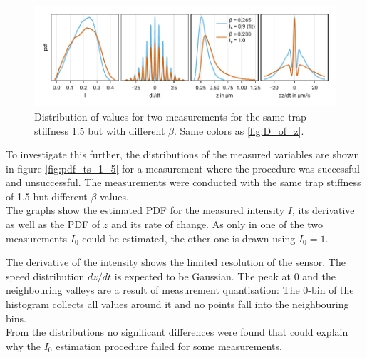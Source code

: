 \documentclass[
    twoside=false,
    twocolumn=true,
    fontsize=11pt,
]{scrarticle}
\begin{document}
\begin{figure}
    \centering
    \includegraphics{figures/02_04_02_hist.pdf}
    \caption{Distribution of values for two measurements for the same trap stiffness \SI{1.5}{} but with different $\beta$. Same colors as \autoref{fig:D_of_z}.}
    \label{fig:pdf_ts_1_5}
\end{figure}
To investigate this further, the distributions of the measured variables are shown in figure \autoref{fig:pdf_ts_1_5} for a measurement where the procedure was successful and unsuccessful. 
The measurements were conducted with the same trap stiffness of \SI{1.5}{} but different $\beta$ values.\\
The graphs show the estimated PDF for the measured intensity $I$, its derivative as well as the PDF of $z$ and its rate of change. 
As only in one of the two measurements $I_0$ could be estimated, the other one is drawn using $I_0=1$.

The derivative of the intensity shows the limited resolution of the sensor.
The speed distribution $dz/dt$ is expected to be Gaussian.
The peak at $0$ and the neighbouring valleys are a result of measurement quantisation: The $0$-bin of the histogram collects all values around it and no points fall into the neighbouring bins.\\
From the distributions no significant differences were found that could explain why the $I_0$ estimation procedure failed for some measurements.
\end{document}
